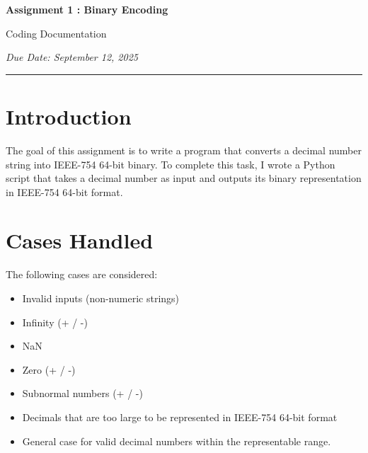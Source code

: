 \documentclass[12pt]{article}
\begin{document}
\begin{center}
\textbf{\huge Assignment 1 : Binary Encoding}

{\Large{Coding Documentation}}

{\large\emph{Due Date: September 12, 2025}}
\vspace{1em}
\end{center}

\hrule

\smallskip

\section*{Introduction}
The goal of this assignment is to write a program that converts a decimal number string into IEEE-754 64-bit binary. To complete this task, I wrote a Python script that takes a decimal number as input and outputs its binary representation in IEEE-754 64-bit format.

\section*{Cases Handled}
The following cases are considered:
\begin{itemize}
    \item Invalid inputs (non-numeric strings)
    \item Infinity (+ / -)
    \item NaN 
    \item Zero (+ / -)
    \item Subnormal numbers (+ / -)
    \item Decimals that are too large to be represented in IEEE-754 64-bit format
    \item General case for valid decimal numbers within the representable range.
\end{itemize}
\end{document}

